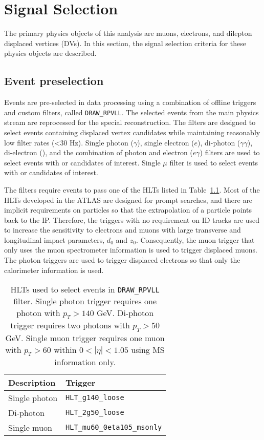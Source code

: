 \chapter{Signal Selection}
\label{chap:signal_selection}

The primary physics objects of this analysis are muons, electrons, and dilepton displaced vertices (DVs). In this section, the signal selection criteria for these physics objects are described.

\section{Event preselection}
\label{sec:selection:pre}

Events are pre-selected in data processing using a combination of offline triggers and custom filters, called \texttt{DRAW\_RPVLL}. The selected events from the main physics stream are reprocessed for the special reconstruction. The filters are designed to select events containing displaced vertex candidates while maintaining reasonably low filter rates (<30 \si{\hertz}). Single photon ($\gamma$), single electron ($e$), di-photon ($\gamma\gamma$), di-electron (\ee), and the combination of photon and electron ($e\gamma$) filters are used to select events with \ee or \emu candidates of interest. Single $\mu$ filter is used to select events with \mumu or \emu candidates of interest.

The filters require events to pass one of the HLTs listed in Table~\ref{table:triggers}. Most of the HLTs developed in the ATLAS are designed for prompt searches, and there are implicit requirements on particles so that the extrapolation of a particle points back to the IP. Therefore, the triggers with no requirement on ID tracks are used to increase the sensitivity to electrons and muons with large transverse and longitudinal impact parameters, $d_{0}$ and $z_{0}$. Consequently, the muon trigger that only uses the muon spectrometer information is used to trigger displaced muons. The photon triggers are used to trigger displaced electrons so that only the calorimeter information is used.

\begin{table}[!htb]
  \centering
  \begin{tabular}{l l}
    \hline
    \hline
    Description     			& Trigger	        	                \\
    \hline
	Single photon 	            & \texttt{HLT\_g140\_loose}             \\
	Di-photon	                & \texttt{HLT\_2g50\_loose}             \\
	Single muon                 & \texttt{HLT\_mu60\_0eta105\_msonly}   \\
    \hline
    \hline
  \end{tabular}
  \caption{HLTs used to select events in \texttt{DRAW\_RPVLL} filter. Single photon trigger requires one photon with $p_{T} > 140$ GeV. Di-photon trigger requires two photons with $p_{T} > 50$ GeV. Single muon trigger requires one muon with $p_{T} > 60$ within $0 < |\eta| < 1.05$ using MS information only.}
  \label{table:triggers}
\end{table}

